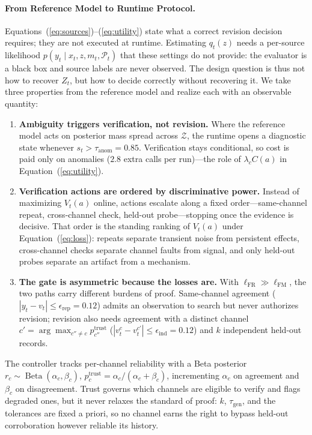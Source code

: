 \documentclass{article}
\begin{document}
\paragraph{From Reference Model to Runtime Protocol.}
Equations~(\ref{eq:sources})--(\ref{eq:utility}) state what a correct revision decision requires; they are not executed at runtime. Estimating $q_t(z)$ needs a per-source likelihood $p(y_t\mid x_t,z,m_t,\mathcal{P}_t)$ that these settings do not provide: the evaluator is a black box and source labels are never observed. The design question is thus not how to recover $Z_t$, but how to decide correctly without recovering it. We take three properties from the reference model and realize each with an observable quantity:
\begin{enumerate}[nosep, leftmargin=12pt]
  \item \textbf{Ambiguity triggers verification, not revision.} Where the reference model acts on posterior mass spread across $\mathcal{Z}$, the runtime opens a diagnostic state whenever $s_t > \tau_{\mathrm{anom}} = 0.85$. Verification stays conditional, so cost is paid only on anomalies ($2.8$ extra calls per run)---the role of $\lambda_c C(a)$ in Equation~(\ref{eq:utility}).
  \item \textbf{Verification actions are ordered by discriminative power.} Instead of maximizing $V_t(a)$ online, actions escalate along a fixed order---same-channel repeat, cross-channel check, held-out probe---stopping once the evidence is decisive. That order is the standing ranking of $V_t(a)$ under Equation~(\ref{eq:loss}): repeats separate transient noise from persistent effects, cross-channel checks separate channel faults from signal, and only held-out probes separate an artifact from a mechanism.
  \item \textbf{The gate is asymmetric because the losses are.} With $\ell_{\mathrm{FR}} \gg \ell_{\mathrm{FM}}$, the two paths carry different burdens of proof. Same-channel agreement ($|y_t - v_t| \le \epsilon_{\mathrm{rep}} = 0.12$) admits an observation to search but never authorizes revision; revision also needs agreement with a distinct channel $c' = \arg\max_{c'' \neq c} p_{c''}^{\mathrm{trust}}$ ($|v_t^c - v_t^{c'}| \le \epsilon_{\mathrm{ind}} = 0.12$) and $k$ independent held-out records.
\end{enumerate}
The controller tracks per-channel reliability with a Beta posterior $r_c \sim \operatorname{Beta}(\alpha_c,\beta_c)$, $p_c^{\mathrm{trust}} = \alpha_c/(\alpha_c+\beta_c)$, incrementing $\alpha_c$ on agreement and $\beta_c$ on disagreement. Trust governs which channels are eligible to verify and flags degraded ones, but it never relaxes the standard of proof: $k$, $\tau_{\mathrm{gen}}$, and the tolerances are fixed a priori, so no channel earns the right to bypass held-out corroboration however reliable its history.
\end{document}
